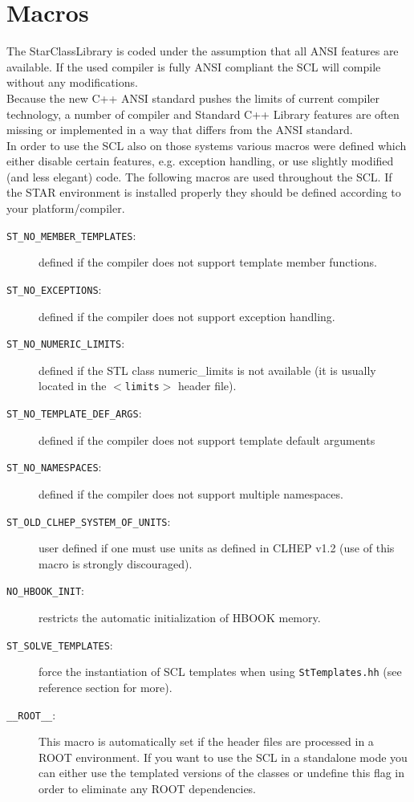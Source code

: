 \documentclass[twoside]{article}
\newcommand{\name}[1]{\textsf{#1}}%
\newcommand{\comp}[1]{\texttt{#1}}%
\begin{document}
\section{Macros}  \label{Macros}

The \name{StarClassLibrary} is coded under the assumption that all
ANSI features are available. If the used compiler is fully ANSI
compliant the SCL will compile without any modifications.\\
Because the new C++ ANSI standard pushes the limits of current  
compiler technology, a number of compiler and Standard C++ Library 
features are often missing or implemented in a way that differs from
the ANSI standard.\\
In order to use the SCL also on those systems various macros were defined
which either disable certain features, e.g. exception handling, or use
slightly modified (and less elegant) code.
The following macros are used throughout the SCL.
If the STAR environment is installed properly they should be defined
according to your platform/compiler. 

\begin{description}
\item[\comp{ST\_NO\_MEMBER\_TEMPLATES}:] defined if the compiler does
    not support template member functions.
\item[\comp{ST\_NO\_EXCEPTIONS}:] defined if the compiler does not
    support exception handling. 
\item[\comp{ST\_NO\_NUMERIC\_LIMITS}:] defined if the STL class
    \name{numeric\_limits} is not available (it is usually located in
    the $<$\comp{limits}$>$ header file).
\item[\comp{ST\_NO\_TEMPLATE\_DEF\_ARGS}:] defined if the compiler
    does not support template default arguments
\item[\comp{ST\_NO\_NAMESPACES}:] defined if the compiler does not
    support multiple namespaces.
\item[\comp{ST\_OLD\_CLHEP\_SYSTEM\_OF\_UNITS}:] user defined if one
    must use units as defined in CLHEP v1.2 (use of this macro is
    strongly discouraged).
\item[\comp{NO\_HBOOK\_INIT}:] restricts the automatic initialization
    of HBOOK memory.
\item[\comp{ST\_SOLVE\_TEMPLATES}:] force the instantiation of SCL
    templates when using \texttt{StTemplates.hh} (see reference
    section for more).
\item[\comp{\_\_ROOT\_\_}:] This macro is automatically set if the
    header files are processed in a ROOT environment. If you want to
    use the SCL in a standalone mode you can either use the templated
    versions of the classes or undefine this flag in order to
    eliminate any ROOT dependencies. 
\end{description}
\end{document}
